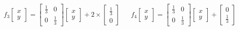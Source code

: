 \documentclass[a4paper,10pt]{report}
\begin{document}
\begin{equation}
\begin{array}{lll}
f_3 \left[ \begin{array}{l} x \\ y \end{array} \right] =
\left[ \begin{array}{ll} \frac{1}{3} & 0 \\ 0 & \frac{1}{3} \end{array} \right]
\left[ \begin{array}{l} x \\ y \end{array} \right]
+ 2 \times \left[ \begin{array}{l} \frac{1}{3} \\ 0 \end{array} \right]
& &
f_4 \left[ \begin{array}{l} x \\ y \end{array} \right] =
\left[ \begin{array}{ll} \frac{1}{3} & 0 \\ 0 & \frac{1}{3} \end{array} \right]
\left[ \begin{array}{l} x \\ y \end{array} \right]
+ \left[ \begin{array}{l} 0 \\ \frac{1}{3} \end{array} \right]\\ \\


\end{array}
\end{equation}
\end{document}
